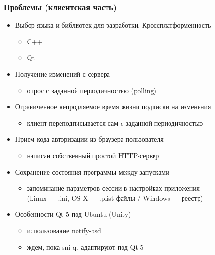 \documentclass[10pt,pdf,hyperref={unicode}]{beamer}
\begin{document}
    \begin{frame}\frametitle{Проблемы (клиентская часть)}
        \begin{itemize}%
            \item Выбор языка и библиотек для разработки. Кроссплатформенность
            \pause
            \begin{itemize}
                \item C++
                \item Qt
            \end{itemize}
            \pause
            \item Получение изменений с сервера
            \pause
            \begin{itemize}
                \item опрос с заданной периодичностью (polling)
            \end{itemize}
            \pause
            \item Ограниченное непродляемое время жизни подписки на изменения
            \pause
            \begin{itemize}
                \item клиент переподписывается сам c заданной периодичностью
            \end{itemize}
            \pause
            \item Прием кода авторизации из браузера пользователя
            \pause
            \begin{itemize}
                \item написан собственный простой HTTP-сервер
            \end{itemize}
            \pause
            \item Сохранение состояния программы между запусками
            \pause
            \begin{itemize}
                \item запоминание параметров сессии в настройках приложения \\
                (Linux --- .ini, OS X --- .plist файлы / Windows --- реестр)
            \end{itemize}
            \pause
            \item Особенности Qt 5 под Ubuntu (Unity)
            \begin{itemize}
                \item использование notify-osd
                \item ждем, пока sni-qt адаптируют под Qt 5
            \end{itemize}
        \end{itemize}
    \end{frame}
    
\end{document}
